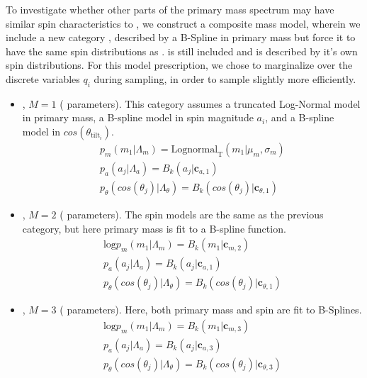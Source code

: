 To investigate whether other parts of the primary mass spectrum may have similar spin characteristics to \first{}, we construct a composite mass model, wherein we include a new category \contA{}, described by a B-Spline in primary mass but force it to have the same spin distributions as \first{}. \contB is still included and is described by it's own spin distributions. For this model prescription, we chose to marginalize over the discrete variables $q_i$ during sampling, in order to sample slightly more efficiently. 

\begin{itemize}
    \item \first{}, $M=1$ ( parameters). This category assumes a truncated Log-Normal model in primary mass, a B-spline model in spin magnitude $a_i$, and a B-spline model in $cos(\theta_{\text{tilt}_i})$. 
    \begin{eqnarray} \label{eq:lowmass}
        p_{m}(m_1| \Lambda_{m}) = \text{Lognormal}_\text{T}(m_1 | \mu_{m}, \sigma_{m}) \\
        p_{a}(a_j| \Lambda_{a}) = B_k(a_j | \mathbf{c}_{a,1}) \\
        p_{\theta}(cos(\theta_j)| \Lambda_{\theta}) = B_k( cos(\theta_j) | \mathbf{c}_{\theta,1})
    \end{eqnarray}

    \item \contA{}, $M=2$ ( parameters). The spin models are the same as the previous category, but here primary mass is fit to a B-spline function. 
    \begin{eqnarray} \label{eq:contmass}
        \text{log} p_{m}(m_1| \Lambda_{m}) = B_k(m_1 | \mathbf{c}_{m, 2}) \\
        p_{a}(a_j| \Lambda_{a}) = B_k(a_j | \mathbf{c}_{a,1}) \\
        p_{\theta}(cos(\theta_j)| \Lambda_{\theta}) = B_k( cos(\theta_j) | \mathbf{c}_{\theta,1})
    \end{eqnarray}
    
    \item \contB{}, $M=3$ ( parameters). Here, both primary mass and spin are fit to B-Splines.
    \begin{eqnarray} \label{eq:contmass}
        \text{log} p_{m}(m_1| \Lambda_{m}) = B_k(m_1 | \mathbf{c}_{m, 3}) \\
        p_{a}(a_j| \Lambda_{a}) = B_k(a_j | \mathbf{c}_{a,3}) \\
        p_{\theta}(cos(\theta_j)| \Lambda_{\theta}) = B_k( cos(\theta_j) | \mathbf{c}_{\theta,3})
    \end{eqnarray}
\end{itemize}